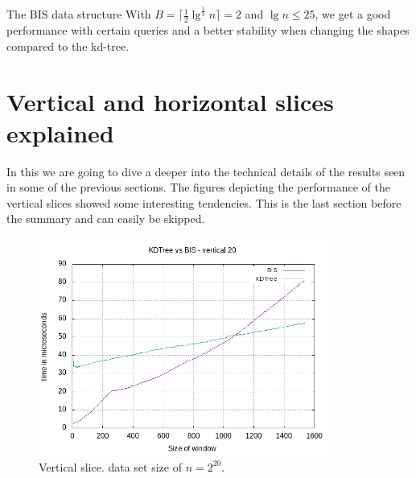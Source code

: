 The BIS data structure With $B = \lceil \frac{1}{2}\lg^{\frac{1}{3}} n \rceil = 2$ and $\lg n \leq 25$, we get a good performance with certain queries and a better stability when changing the shapes compared to the kd-tree. 


\section{Vertical and horizontal slices explained}
\label{sect:verthoriexp}

In this we are going to dive a deeper into the technical details of the results seen in some of the previous sections. The figures depicting the performance of the vertical slices showed some interesting tendencies. This is the last section before the summary and can easily be skipped.

\begin{figure}[h]
    \centering
    \includegraphics[width = 0.85\textwidth]{pictures/analysis/vert_20.png}
    \caption{Vertical slice. data set size of $n=2^{20}$.}\label{fig:vert_20}
\end{figure}


